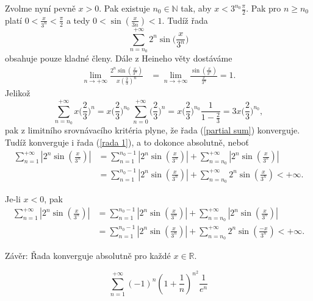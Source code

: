\documentclass[answers]{exam}
\begin{document}
\begin{questions}
\begin{solution}
		Zvolme nyn\'i pevn\v e $x>0$. Pak existuje $n_0\in\mathbb N$ tak, aby $x<3^{n_0}\frac{\pi}{2}$. Pak pro $n\ge n_0$ plat\'i $0<\frac{x}{3^n}<\frac{\pi}{2}$ a tedy $0<\sin(\frac{x}{3n})<1$. Tud\'i\v z \v rada
		\begin{equation}\label{partial sum}
		\sum_{n=n_0}^{+\infty}2^n\sin\big(\frac{x}{3^n}\big) 
		\end{equation}
		obsahuje pouze kladn\'e \v cleny. D\'ale z Heineho v\v ety dost\'av\'ame
		\begin{align*}
		\lim\limits_{n\to+\infty}\frac{2^n\sin(\frac{x}{3^n})}{x(\frac{2}{3})^n}&=\lim\limits_{n\to+\infty}\frac{\sin(\frac{x}{3^n})}{\frac{x}{3^n}}=1.
		\end{align*}
		Jeliko\v z 
		$$\sum_{n=n_0}^{+\infty}x\bigg(\frac{2}{3}\bigg)^n=x\bigg(\frac{2}{3}\bigg)^{n_0}\  \sum_{n=0}^{+\infty}\bigg(\frac{2}{3}\bigg)^n=x\bigg(\frac{2}{3}\bigg)^{n_0}\frac{1}{1-\frac{2}{3}}=3x\bigg(\frac{2}{3}\bigg)^{n_0},$$
		pak z limitn\'iho srovn\'avac\'iho krit\'eria plyne, \v ze \v rada (\ref{partial sum}) konverguje. Tud\'i\v z konverguje i \v rada (\ref{rada 1}), a to dokonce absolutn\v e, nebo\v t
		\begin{align*}
		\sum_{n=1}^{+\infty}\left|2^n\sin\left(\frac{x}{3^n}\right)\right|&=\sum_{n=1}^{n_0-1}\left|2^n\sin\left(\frac{x}{3^n}\right)\right|+\sum_{n=n_0}^{+\infty}\left|2^n\sin\left(\frac{x}{3^n}\right)\right|\\
		&=\sum_{n=1}^{n_0-1}\left|2^n\sin\left(\frac{x}{3^n}\right)\right|+\sum_{n=n_0}^{+\infty}2^n\sin\left(\frac{x}{3^n}\right)<+\infty.
		\end{align*}
		
		Je-li $x<0$, pak
		\begin{align*}
		\sum_{n=1}^{+\infty}\left|2^n\sin\left(\frac{x}{3^n}\right)\right|&=\sum_{n=1}^{n_0-1}\left|2^n\sin\left(\frac{x}{3^n}\right)\right|+\sum_{n=n_0}^{+\infty}\left|2^n\sin\left(\frac{x}{3^n}\right)\right|\\
		&=\sum_{n=1}^{n_0-1}\left|2^n\sin\left(\frac{x}{3^n}\right)\right|+\sum_{n=n_0}^{+\infty}2^n\sin\left(\frac{-x}{3^n}\right)<+\infty.
		\end{align*}
		
		Závěr: Řada konverguje absolutn\v e pro ka\v zd\'e $x\in\mathbb{R}$.
  \end{solution}

  \question
  \begin{equation*}
    \sum_{n = 1}^{+\infty}
    \left( -1 \right)^n
    \left( 1 + \frac{1}{n} \right)^{n^2}
    \frac{1}{e^n}
  \end{equation*}
  

\end{questions}
\end{document}
